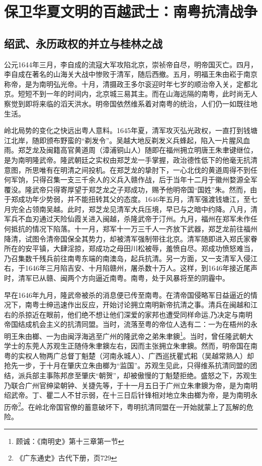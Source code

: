 \chapter{保卫华夏文明的百越武士：南粤抗清战争}

\section{绍武、永历政权的并立与桂林之战}


公元1644年三月，李自成的流寇大军攻陷北京，崇祯帝自尽，明帝国灭亡。四月，李自成在著名的山海关大战中惨败于清军，随后西撤。五月，明福王朱由崧于南京称帝，是为南明弘光帝。十月，清摄政王多尔衮迎时年七岁的顺治帝入关，定都北京。短短不到一年的时间内，北京城三易其主。而在山海远隔的南粤，此时尚无人察觉到即将来临的滔天洪水。明帝国依然维系着对南粤的统治，人们仍一如既往地生活。

岭北局势的变化之快远出粤人意料。1645年夏，清军攻灭弘光政权，一直打到钱塘江北岸，随即颁布野蛮的“剃发令”。吴越大地反剃发义兵蜂起，陷入一片腥风血雨。郑芝龙及闽籍高官黄道周（漳浦铜山人）随即在福州拥立明唐王朱聿键继位，是为南明隆武帝。隆武朝廷之实权由郑芝龙一手掌握，政治德性低下的他毫无抗清意图，所思唯有在明清之间投机。在郑芝龙的挚肘下，一心北伐的黄道周得不到任何军饷，只得召集一支三千余人的义兵入赣作战，后于当年十二月于徽州婺源全军覆没。隆武帝只得寄厚望于郑芝龙之子郑成功，赐予他明帝国“国姓”朱。然而，由于郑成功年少势弱，并不能扭转其父的态度。1646年五月，清军强渡钱塘江，至七月完全占领南吴越。此时，郑芝龙见清军大兵压境，早已与之暗中约降。八月，清军兵不血刃通过天险仙霞关进入闽越，杀隆武帝于汀州。九月，福州在郑军未作任何抵抗的情况下陷落。十一月，郑军十一万三千人一齐放下武器，郑芝龙前往福州降清，试图令清帝国保全其势力，却被清军强制带往北京。清军随即进入郑氏家眷所在的安平镇，大肆淫掠，郑成功之母田川松被辱，羞愤自尽。郑成功愤怒难当，乃召集数千残兵前往南粤东端的南澳岛，起兵抗清。另一方面，又一支清军入侵江右，于1646年三月陷吉安、十月陷赣州，屠杀数十万人。这样，到1646年接近尾声时，清军已从赣、闽两个方向逼近南粤。南粤，处于风暴将至的阴霾中。

早在1646年九月，隆武帝被杀的消息便已传至南粤。在清帝国侵略军日益逼近的情况下，南粤士绅迅速作出反应，开始讨论拥立南明新帝抗清之事。清兵在闽越和江右的杀掠近在眼前，他们绝不想让他们深爱的家邦也遭受同样命运,乃决定与南明帝国结成机会主义的抗清同盟。当时，流落至粤的帝位人选有二：一为在梧州的永明王朱由榔、一为由闽浮海逃至广州的隆武帝之弟朱聿鐭\footnote{顾诚：《南明史》第十三章第一节}。当时，曾任隆武朝大学士的东莞人苏观生正随侍朱聿鐭左右，因而主张拥立朱聿鐭。然而，明帝国在南粤的实权人物两广总督丁魁楚（河南永城人）、广西巡抚瞿式耜（吴越常熟人）却抢先一步，于十月在肇庆立朱由榔为“监国”。苏观生见此，只得维系抗清同盟的团结，派兵部主事陈邦彦至肇庆“朝贺”，却被傲慢的丁魁楚拒绝。盛怒之下，苏观生乃联合广州官绅梁朝钟、关捷先等，于十一月五日于广州立朱聿鐭为帝，是为南明绍武帝。丁、瞿二人不甘示弱，在十三日后针锋相对地立朱由榔为帝，是为南明永历帝\footnote{《广东通史》古代下册，页729}。在岭北帝国官僚的蓄意破坏下，粤明抗清同盟在一开始就蒙上了瓦解的危险。

